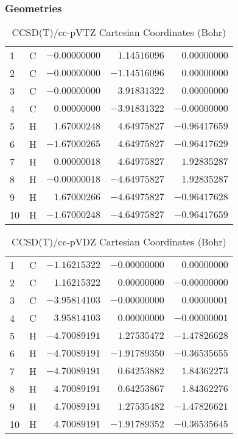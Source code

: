 \documentclass[10pt,oneside]{article}
\begin{document}
\clearpage

\subsection{\ \ \ }

\subsubsection*{Geometries}
\begin{table}[h!]
\centering
\caption{CCSD(T)/cc-pVTZ Cartesian Coordinates (Bohr)}
\begin{tabular}{llrrr}
1  & C  & $-0.00000000$ & $ 1.14516096$ & $ 0.00000000$ \\
2  & C  & $-0.00000000$ & $-1.14516096$ & $ 0.00000000$ \\
3  & C  & $-0.00000000$ & $ 3.91831322$ & $ 0.00000000$ \\
4  & C  & $ 0.00000000$ & $-3.91831322$ & $-0.00000000$ \\
5  & H  & $ 1.67000248$ & $ 4.64975827$ & $-0.96417659$ \\
6  & H  & $-1.67000265$ & $ 4.64975827$ & $-0.96417629$ \\
7  & H  & $ 0.00000018$ & $ 4.64975827$ & $ 1.92835287$ \\
8  & H  & $-0.00000018$ & $-4.64975827$ & $ 1.92835287$ \\
9  & H  & $ 1.67000266$ & $-4.64975827$ & $-0.96417628$ \\
10 & H  & $-1.67000248$ & $-4.64975827$ & $-0.96417659$ \\
\end{tabular}
\end{table}

\begin{table}[h!]
\centering
\caption{CCSD(T)/cc-pVDZ Cartesian Coordinates (Bohr)}
\begin{tabular}{llrrr}
1  & C  & $-1.16215322$ & $-0.00000000$ & $ 0.00000000$ \\
2  & C  & $ 1.16215322$ & $ 0.00000000$ & $-0.00000000$ \\
3  & C  & $-3.95814103$ & $-0.00000000$ & $ 0.00000001$ \\
4  & C  & $ 3.95814103$ & $ 0.00000000$ & $-0.00000001$ \\
5  & H  & $-4.70089191$ & $ 1.27535472$ & $-1.47826628$ \\
6  & H  & $-4.70089191$ & $-1.91789350$ & $-0.36535655$ \\
7  & H  & $-4.70089191$ & $ 0.64253882$ & $ 1.84362273$ \\
8  & H  & $ 4.70089191$ & $ 0.64253867$ & $ 1.84362276$ \\
9  & H  & $ 4.70089191$ & $ 1.27535482$ & $-1.47826621$ \\
10 & H  & $ 4.70089191$ & $-1.91789352$ & $-0.36535645$ \\
\end{tabular}
\end{table}
\end{document}
